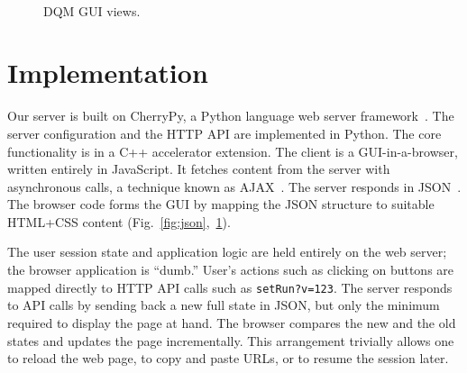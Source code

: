 \documentclass[a4paper]{jpconf}
\begin{document}
\begin{figure}[!tbp]
\begin{center}
\hfill
{}\hfill
{}\\
\hfill
{}\hfill
{}
\end{center}
\caption{\label{fig:views}DQM GUI views.}
\end{figure}


\section{Implementation}

Our server is built on CherryPy, a Python language web server
framework~\cite{cherrypy}.  The server configuration and the HTTP API
are implemented in Python.  The core functionality is in a C++
accelerator extension.  The client is a GUI-in-a-browser, written
entirely in JavaScript.  It fetches content from the server with
asynchronous calls, a technique known as
AJAX~\cite{dqm_ajax_06,cms_webtools_07}.  The server responds in
JSON~\cite{dqm_ajax_06,json}.  The browser code forms the GUI by
mapping the JSON structure to suitable HTML+CSS content
(Fig.~\ref{fig:json},~\ref{fig:views}).

The user session state and application logic are held entirely on the
web server; the browser application is ``dumb.'' User's actions such
as clicking on buttons are mapped directly to HTTP API calls such as
{\tt setRun?v=123}.  The server responds to API calls by sending back
a new full state in JSON, but only the minimum required to display the
page at hand.  The browser compares the new and the old states and
updates the page incrementally.  This arrangement trivially allows one
to reload the web page, to copy and paste URLs, or to resume the
session later.
\end{document}
